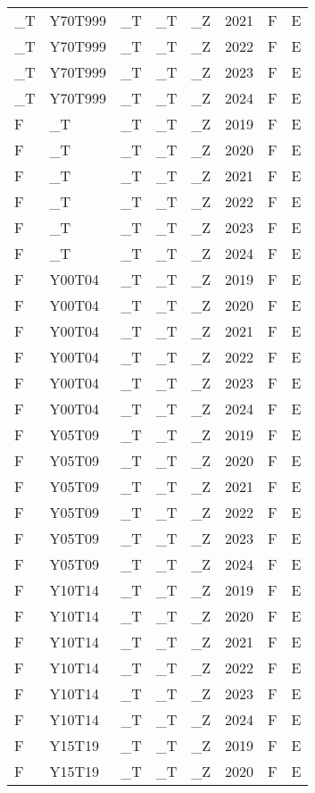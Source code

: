 \begin{longtable}[t]{llllllll}
\_T & Y70T999 & \_T & \_T & \_Z & 2021 & F & E\\
\_T & Y70T999 & \_T & \_T & \_Z & 2022 & F & E\\
\_T & Y70T999 & \_T & \_T & \_Z & 2023 & F & E\\
\_T & Y70T999 & \_T & \_T & \_Z & 2024 & F & E\\
\addlinespace
F & \_T & \_T & \_T & \_Z & 2019 & F & E\\
F & \_T & \_T & \_T & \_Z & 2020 & F & E\\
F & \_T & \_T & \_T & \_Z & 2021 & F & E\\
F & \_T & \_T & \_T & \_Z & 2022 & F & E\\
F & \_T & \_T & \_T & \_Z & 2023 & F & E\\
\addlinespace
F & \_T & \_T & \_T & \_Z & 2024 & F & E\\
F & Y00T04 & \_T & \_T & \_Z & 2019 & F & E\\
F & Y00T04 & \_T & \_T & \_Z & 2020 & F & E\\
F & Y00T04 & \_T & \_T & \_Z & 2021 & F & E\\
F & Y00T04 & \_T & \_T & \_Z & 2022 & F & E\\
\addlinespace
F & Y00T04 & \_T & \_T & \_Z & 2023 & F & E\\
F & Y00T04 & \_T & \_T & \_Z & 2024 & F & E\\
F & Y05T09 & \_T & \_T & \_Z & 2019 & F & E\\
F & Y05T09 & \_T & \_T & \_Z & 2020 & F & E\\
F & Y05T09 & \_T & \_T & \_Z & 2021 & F & E\\
\addlinespace
F & Y05T09 & \_T & \_T & \_Z & 2022 & F & E\\
F & Y05T09 & \_T & \_T & \_Z & 2023 & F & E\\
F & Y05T09 & \_T & \_T & \_Z & 2024 & F & E\\
F & Y10T14 & \_T & \_T & \_Z & 2019 & F & E\\
F & Y10T14 & \_T & \_T & \_Z & 2020 & F & E\\
\addlinespace
F & Y10T14 & \_T & \_T & \_Z & 2021 & F & E\\
F & Y10T14 & \_T & \_T & \_Z & 2022 & F & E\\
F & Y10T14 & \_T & \_T & \_Z & 2023 & F & E\\
F & Y10T14 & \_T & \_T & \_Z & 2024 & F & E\\
F & Y15T19 & \_T & \_T & \_Z & 2019 & F & E\\
\addlinespace
F & Y15T19 & \_T & \_T & \_Z & 2020 & F & E\\

\end{longtable}

